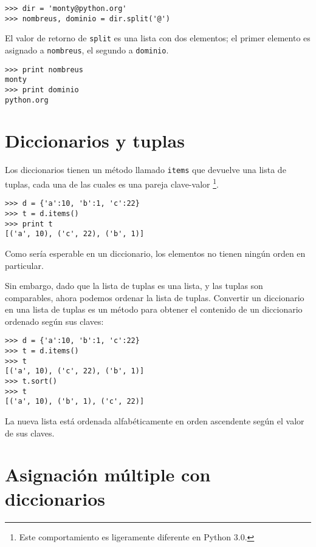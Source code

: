 \beforeverb
\begin{verbatim}
>>> dir = 'monty@python.org'
>>> nombreus, dominio = dir.split('@')
\end{verbatim}
\afterverb
%
El valor de retorno de {\tt split} es una lista con dos elementos;
el primer elemento es asignado a {\tt nombreus}, el segundo a
{\tt dominio}.

\beforeverb
\begin{verbatim}
>>> print nombreus
monty
>>> print dominio
python.org
\end{verbatim}
\afterverb
%

\section{Diccionarios y tuplas}


Los diccionarios tienen un método llamado {\tt items} que devuelve una lista de
tuplas, cada una de las cuales es una pareja clave-valor
\footnote{Este comportamiento es ligeramente diferente en Python 3.0.}.

\beforeverb
\begin{verbatim}
>>> d = {'a':10, 'b':1, 'c':22}
>>> t = d.items()
>>> print t
[('a', 10), ('c', 22), ('b', 1)]
\end{verbatim}
\afterverb
%
Como sería esperable en un diccionario, los elementos no
tienen ningún orden en particular.

Sin embargo, dado que la lista de tuplas es una lista, y las tuplas
son comparables, ahora podemos ordenar la lista de tuplas. Convertir un diccionario
en una lista de tuplas es un método para obtener el contenido de un
diccionario ordenado según sus claves:

\beforeverb
\begin{verbatim}
>>> d = {'a':10, 'b':1, 'c':22}
>>> t = d.items()
>>> t
[('a', 10), ('c', 22), ('b', 1)]
>>> t.sort()
>>> t
[('a', 10), ('b', 1), ('c', 22)]
\end{verbatim}
\afterverb
%
La nueva lista está ordenada alfabéticamente en orden ascendente según el valor de sus claves.

\section{Asignación múltiple con diccionarios}


